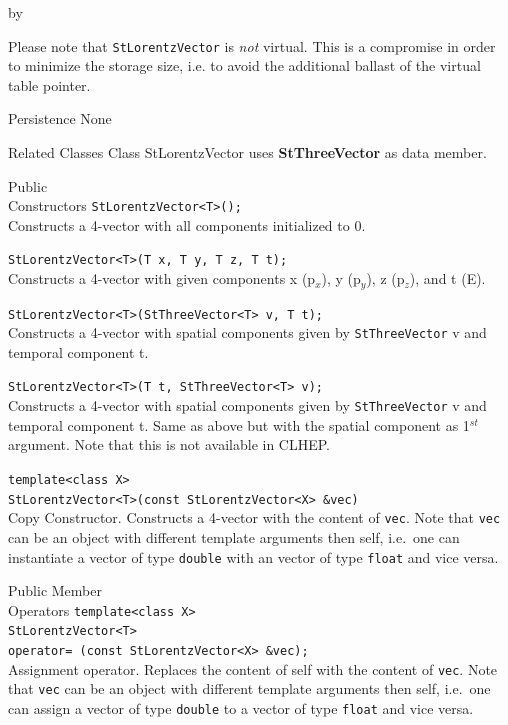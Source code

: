 \documentclass[twoside]{article}
\newcommand{\comp}[1]{\texttt{#1}}%
\newcommand{\entrylabel}[1]{\mbox{\textbf{{#1}}}\hfil}%
\newenvironment{entry}
{\begin{list}{}%
    {\renewcommand{\makelabel}{\entrylabel}%
     \setlength{\labelwidth}{90pt}%
     \setlength{\leftmargin}{\labelwidth}
     \advance\leftmargin by \labelsep%
      }%
    }%
  {\end{list}}
\newcommand{\Entrylabel}[1]%
{\raisebox{0pt}[1ex][0pt]{\makebox[\labelwidth][l]%
    {\parbox[t]{\labelwidth}{\hspace{0pt}\textbf{{#1}}}}}}
\newenvironment{Entry}%
{\renewcommand{\entrylabel}{\Entrylabel}\begin{entry}}%
  {\end{entry}}
\begin{document}
\begin{description}
\begin{Entry}
    Please note that \comp{StLorentzVector} is {\em not} virtual. This
    is a compromise in order to minimize the storage size, i.e. to
    avoid the additional ballast of the virtual table pointer.

\item[Persistence]
    None

\item[Related Classes]
    Class StLorentzVector uses {\bf StThreeVector}
    as data member.

\item[Public\\ Constructors]
    \verb+StLorentzVector<T>();+ \\
    Constructs a 4-vector with all components initialized to 0.
    
    \verb+StLorentzVector<T>(T x, T y, T z, T t);+ \\
    Constructs a 4-vector with given
    components x (p$_{x}$), y (p$_{y}$), z (p$_{z}$),
    and t (E).

    \verb+StLorentzVector<T>(StThreeVector<T> v, T t);+ \\
    Constructs a 4-vector with spatial components given by
    \comp{StThreeVector} v and temporal component t.

    \verb+StLorentzVector<T>(T t, StThreeVector<T> v);+ \\
    Constructs a 4-vector with spatial components given by
    \comp{StThreeVector} v and temporal component t.
    Same as above but with the spatial component as 1$^{st}$ argument.
    Note that this is not available in CLHEP.
        
    \verb+template<class X>+\\
    \verb+StLorentzVector<T>(const StLorentzVector<X> &vec)+\\
    Copy Constructor. Constructs a 4-vector with the content of \comp{vec}.
    Note that \comp{vec} can be an object with different
    template arguments then self, i.e.~one can instantiate
    a vector of type \comp{double} with an vector of type
    \comp{float} and vice versa.   
    
\item[Public Member\\ Operators]
    \verb+template<class X>+\\
    \verb+StLorentzVector<T>+\\
    \verb+operator= (const StLorentzVector<X> &vec);+ \\
    Assignment operator. Replaces the content of self with the content of \comp{vec}.
    Note that \comp{vec} can be an object with different
    template arguments then self, i.e.~one can assign
    a vector of type \comp{double} to a vector of type
    \comp{float} and vice versa.  
    

\end{Entry}
\end{description}
\end{document}
